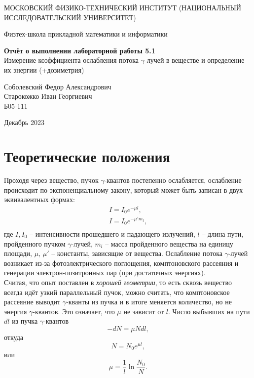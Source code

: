 \documentclass[a4paper,12pt]{article} %
\date{\today}
\begin{document}
\begin{titlepage}
	\begin{center}
		{\large МОСКОВСКИЙ ФИЗИКО-ТЕХНИЧЕСКИЙ ИНСТИТУТ (НАЦИОНАЛЬНЫЙ ИССЛЕДОВАТЕЛЬСКИЙ УНИВЕРСИТЕТ)}
	\end{center}
	\begin{center}
		{\large Физтех-школа прикладной математики и информатики}
	\end{center}
	
	
	\vspace{4.5cm}
	{\huge
		\begin{center}
			{\bf Отчёт о выполнении лабораторной работы 5.1}\\
			Измерение коэффициента ослабления потока $\gamma$-лучей в
                веществе и определение их энергии (+дозиметрия)
		\end{center}
	}
	\vspace{1cm}
	\begin{center}
		{\large Соболевский Федор Александрович \\
             Старокожко Иван Георгиевич \\ 
			\vspace{0.2cm}
			Б05-111}
	\end{center}
	\vspace{8cm}
	\begin{center}
		  Декабрь 2023
	\end{center}
\end{titlepage}

\section{Теоретические положения}

Проходя через вещество, пучок $\gamma$-квантов постепенно ослабляется, ослабление происходит по экспоненциальному закону, который может быть записан в двух эквивалентных формах:
\[\begin{array}{l}
I = I_0 e^{-\mu l} ,\\
I = I_0 e^{-\mu' m_l},\\
\end{array}\]
где $I, I_0$ -- интенсивности прошедшего и падающего излучений, $l$ -- длина пути, пройденного пучком $\gamma$-лучей, $m_l$ -- масса пройденного вещества на единицу площади, $\mu$, $\mu'$ -- константы, зависящие от вещества. Ослабление потока $\gamma$-лучей возникает из-за фотоэлектрического поглощения, комптоновского рассеяния и генерации электрон-позитронных пар (при достаточных энергиях).\\
Считая, что опыт поставлен в \textit{хорошей геометрии}, то есть сквозь вещество всегда идёт узкий параллельный пучок, можно считать, что комптоновское рассеяние выводит $\gamma$-кванты из пучка и в итоге меняется количество, но не энергия $\gamma$-квантов. Это означает, что $\mu$ не зависит от $l$. Число выбывших на пути $dl$ из пучка $\gamma$-квантов
\[-dN = \mu N dl,\]
откуда
\[N = N_0 e^{\mu l},\]
или
\begin{equation}
\mu = \dfrac{1}{l} \ln \dfrac{N_0}{N}.
\end{equation}
\end{document}

